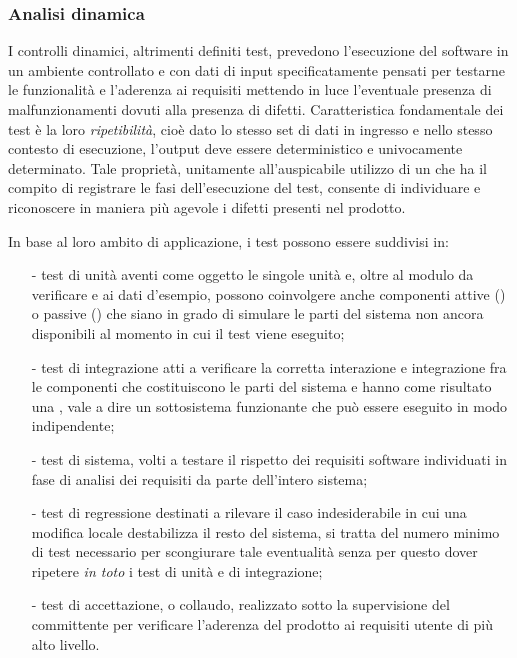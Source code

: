 \subsubsection{Analisi dinamica}
I controlli dinamici, altrimenti definiti test, prevedono l'esecuzione del software in un ambiente controllato e con dati di input specificatamente pensati per testarne le funzionalità e l'aderenza ai requisiti mettendo in luce l'eventuale presenza di malfunzionamenti dovuti alla presenza di difetti. Caratteristica fondamentale dei test è la loro \emph{ripetibilità}, cioè dato lo stesso set di dati in ingresso e nello stesso contesto di esecuzione, l'output deve essere deterministico e univocamente determinato. Tale proprietà, unitamente all'auspicabile utilizzo di un  che ha il compito di registrare le fasi dell'esecuzione del test, consente di individuare e riconoscere in maniera più agevole i difetti presenti nel prodotto.

In base al loro ambito di applicazione, i test possono essere suddivisi in:
\begin{itemize}
  \item[-] test di unità aventi come oggetto le singole unità e, oltre al modulo da verificare e ai dati d'esempio, possono coinvolgere anche componenti attive () o passive () che siano in grado di simulare le parti del sistema non ancora disponibili al momento in cui il test viene eseguito;
  \item[-] test di integrazione atti a verificare la corretta interazione e integrazione fra le componenti che costituiscono le parti del sistema e hanno come risultato una , vale a dire un sottosistema funzionante che può essere eseguito in modo indipendente;
  \item[-] test di sistema, volti a testare il rispetto dei requisiti software individuati in fase di analisi dei requisiti da parte dell'intero sistema; 
  \item[-] test di regressione destinati a rilevare il caso indesiderabile in cui una modifica locale destabilizza il resto del sistema, si tratta del numero minimo di test necessario per scongiurare tale eventualità senza per questo dover ripetere \emph{in toto} i test di unità e di integrazione;
  \item[-] test di accettazione, o collaudo, realizzato sotto la supervisione del committente per verificare l'aderenza del prodotto ai requisiti utente di più alto livello.
\end{itemize}

